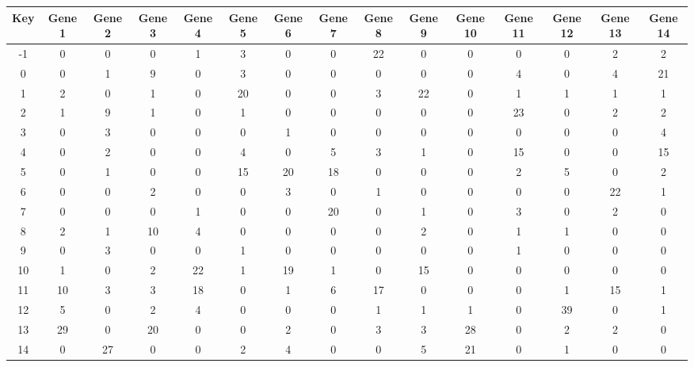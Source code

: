 \begin{tabular}{|c|c|c|c|c|c|c|c|c|c|c|c|c|c|c|}
\hline
Key & Gene 1 & Gene 2 & Gene 3 & Gene 4 & Gene 5 & Gene 6 & Gene 7 & Gene 8 & Gene 9 & Gene 10 & Gene 11 & Gene 12 & Gene 13 & Gene 14 \\
\hline
-1 & 0 & 0 & 0 & 1 & 3 & 0 & 0 & 22 & 0 & 0 & 0 & 0 & 2 & 2 \\
0 & 0 & 1 & 9 & 0 & 3 & 0 & 0 & 0 & 0 & 0 & 4 & 0 & 4 & 21 \\
1 & 2 & 0 & 1 & 0 & 20 & 0 & 0 & 3 & 22 & 0 & 1 & 1 & 1 & 1 \\
2 & 1 & 9 & 1 & 0 & 1 & 0 & 0 & 0 & 0 & 0 & 23 & 0 & 2 & 2 \\
3 & 0 & 3 & 0 & 0 & 0 & 1 & 0 & 0 & 0 & 0 & 0 & 0 & 0 & 4 \\
4 & 0 & 2 & 0 & 0 & 4 & 0 & 5 & 3 & 1 & 0 & 15 & 0 & 0 & 15 \\
5 & 0 & 1 & 0 & 0 & 15 & 20 & 18 & 0 & 0 & 0 & 2 & 5 & 0 & 2 \\
6 & 0 & 0 & 2 & 0 & 0 & 3 & 0 & 1 & 0 & 0 & 0 & 0 & 22 & 1 \\
7 & 0 & 0 & 0 & 1 & 0 & 0 & 20 & 0 & 1 & 0 & 3 & 0 & 2 & 0 \\
8 & 2 & 1 & 10 & 4 & 0 & 0 & 0 & 0 & 2 & 0 & 1 & 1 & 0 & 0 \\
9 & 0 & 3 & 0 & 0 & 1 & 0 & 0 & 0 & 0 & 0 & 1 & 0 & 0 & 0 \\
10 & 1 & 0 & 2 & 22 & 1 & 19 & 1 & 0 & 15 & 0 & 0 & 0 & 0 & 0 \\
11 & 10 & 3 & 3 & 18 & 0 & 1 & 6 & 17 & 0 & 0 & 0 & 1 & 15 & 1 \\
12 & 5 & 0 & 2 & 4 & 0 & 0 & 0 & 1 & 1 & 1 & 0 & 39 & 0 & 1 \\
13 & 29 & 0 & 20 & 0 & 0 & 2 & 0 & 3 & 3 & 28 & 0 & 2 & 2 & 0 \\
14 & 0 & 27 & 0 & 0 & 2 & 4 & 0 & 0 & 5 & 21 & 0 & 1 & 0 & 0 \\
\hline
\end{tabular}